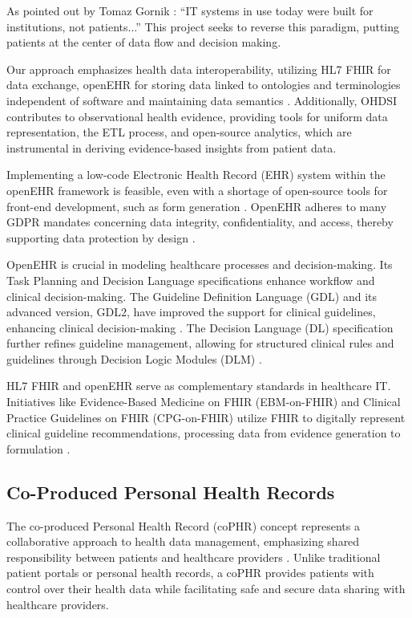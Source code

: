 As pointed out by Tomaz Gornik \cite{Gornik2021}: ``IT systems in use today were built for institutions, not patients...'' This project seeks to reverse this paradigm, putting patients at the center of data flow and decision making.

Our approach emphasizes health data interoperability, utilizing HL7 FHIR for data exchange, openEHR for storing data linked to ontologies and terminologies independent of software and maintaining data semantics \cite{frade2021openehr}. Additionally, OHDSI contributes to observational health evidence, providing tools for uniform data representation, the ETL process, and open-source analytics, which are instrumental in deriving evidence-based insights from patient data.

Implementing a low-code Electronic Health Record (EHR) system within the openEHR framework is feasible, even with a shortage of open-source tools for front-end development, such as form generation \cite{frade2021openehr}. OpenEHR adheres to many GDPR mandates concerning data integrity, confidentiality, and access, thereby supporting data protection by design \cite{sousa2018openehr}.

OpenEHR is crucial in modeling healthcare processes and decision-making. Its Task Planning and Decision Language specifications enhance workflow and clinical decision-making. The Guideline Definition Language (GDL) and its advanced version, GDL2, have improved the support for clinical guidelines, enhancing clinical decision-making \cite{silva2024openehr}. The Decision Language (DL) specification further refines guideline management, allowing for structured clinical rules and guidelines through Decision Logic Modules (DLM) \cite{beale2021decision}.

HL7 FHIR and openEHR serve as complementary standards in healthcare IT. Initiatives like Evidence-Based Medicine on FHIR (EBM-on-FHIR) and Clinical Practice Guidelines on FHIR (CPG-on-FHIR) utilize FHIR to digitally represent clinical guideline recommendations, processing data from evidence generation to formulation \cite{lichtner2023representation}.

\subsection{Co-Produced Personal Health Records}

The co-produced Personal Health Record (coPHR) concept represents a collaborative approach to health data management, emphasizing shared responsibility between patients and healthcare providers \cite{apperta2018blueprint}. Unlike traditional patient portals or personal health records, a coPHR provides patients with control over their health data while facilitating safe and secure data sharing with healthcare providers.

